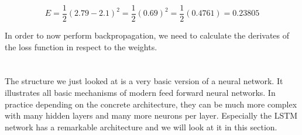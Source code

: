 \documentclass[a4paper,12pt]{report}
\begin{document}
\[
E = \frac{1}{2}(2.79 - 2.1)^2 = \frac{1}{2}(0.69)^2 = \frac{1}{2}(0.4761) = 0.23805
\]

In order to now perform backpropagation, we need to calculate the derivates of the loss function in respect to the weights.\\\\\\
	
	
	
	
	
	
	
	
	
	
	
	
	
	
	
	
	
	
	
	
	
	
	
	
	
	
	
	
	
	
	
	

The structure we just looked at is a very basic version of a neural network. It illustrates all basic mechanisms of modern feed forward neural networks. In practice depending on the concrete architecture, they can be much more complex with many hidden layers and many more neurons per layer. Especially the LSTM network has a remarkable architecture and we will look at it in this section.
	
\end{document}
